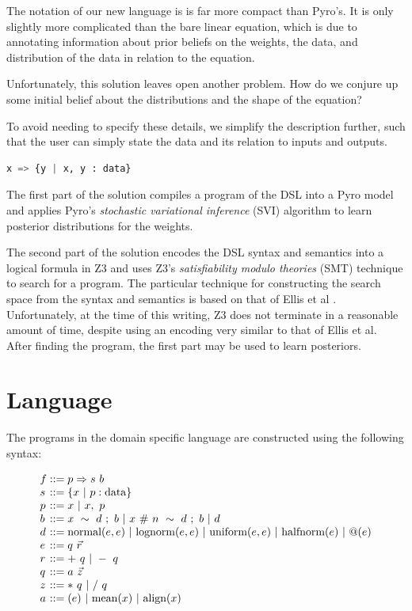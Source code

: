 \documentclass[letterpaper]{llncs}
\begin{document}
The notation of our new language is is far more compact than Pyro's. 
It is only slightly more complicated than the bare linear equation, which is
due to annotating information about prior beliefs on the weights, the data, and 
distribution of the data in relation to the equation. 

Unfortunately, this solution leaves open another problem. How do we conjure up some 
initial belief about the distributions and the shape of the equation? 

To avoid needing to specify these details, we simplify the description further, such that the 
user can simply state the data and its relation to inputs and outputs. 

\begin{lstlisting}[language=Python]
x => {y | x, y : data}
\end{lstlisting}

The first part of the solution compiles a program of the DSL into a Pyro model and applies Pyro's 
\textit{stochastic variational inference} (SVI) algorithm \cite{svi} to learn posterior distributions for the weights. 

The second part of the solution encodes the DSL syntax and semantics into
a logical formula in Z3 \cite{z3} and uses Z3's \textit{satisfiability modulo theories} (SMT) technique \cite{smt} to search
for a program.  
The particular technique for constructing the search space from the syntax and semantics 
is based on that of Ellis et al \cite{ellis}.
Unfortunately, at the time of this writing, Z3 does not terminate in a reasonable amount of time, 
despite using an encoding very similar to that of Ellis et al. 
After finding the program, the first part may be used to learn posteriors. 

\section{Language}

The programs in the domain specific language are constructed using the following syntax:

\[
  \begin{array}{l @{} l}
    f &{} ::= p \Rightarrow s\ b \\
    s &{} ::= \{ x \ |\ p : \text{data} \} \\
    p &{} ::= x  \ |\ x,\ p \\
    b &{} ::= x\ \sim\ d\ ;\ b \ |\ x\ \#\ n\ \sim\ d\ ;\ b \ |\ d \\ 
    d &{} ::= 
        \text{normal}(e, e) \ |\ 
        \text{lognorm}(e, e) \ |\ 
        \text{uniform}(e, e) \ |\ 
        \text{halfnorm}(e) \ |\ 
        @(e) \\ 
    e &{} ::= q\ \vec{r} \\
    r &{} ::= +\ q \ |\ -\ q \\
    q &{} ::= a\ \vec{z} \\
    z &{} ::= *\ q \ |\ /\ q \\
    a &{} ::= (e) \ |\ \text{mean}(x) \ |\ \text{align}(x)\\
  \end{array}
\]
\end{document}
